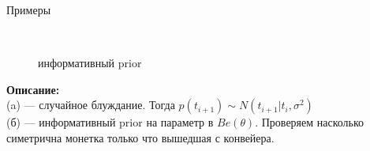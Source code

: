 \documentclass[10pt]{beamer}
\begin{document}
\begin{frame}{Примеры}
\begin{figure}[h!t]\center
{}
\\
\caption{информативный prior}
\end{figure}
{\bf Описание:}\\
\quad
	(a) --- случайное блуждание. Тогда $p(t_{i+1}) \sim N(t_{i+1}|t_{i},\sigma^2)$\\
\quad
	(б) --- информативный prior на параметр в $Be(\theta)$. Проверяем насколько симетрична монетка только что вышедшая с конвейера.\\
	~\\
\end{frame}
\end{document}
